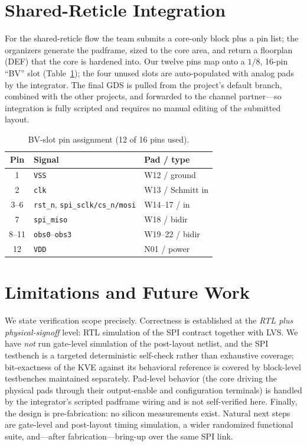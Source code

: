 \documentclass[conference]{IEEEtran}
\begin{document}
\section{Shared-Reticle Integration}
\label{sec:integ}
For the shared-reticle flow the team submits a core-only block plus a pin list;
the organizers generate the padframe, sized to the core area, and return a
floorplan (DEF) that the core is hardened into. Our twelve pins map onto a
$1/8$, 16-pin ``BV'' slot (Table~\ref{tab:pins}); the four unused slots are
auto-populated with analog pads by the integrator. The final GDS is pulled from
the project's default branch, combined with the other projects, and forwarded to
the channel partner---so integration is fully scripted and requires no manual
editing of the submitted layout.

\begin{table}[t]
\caption{BV-slot pin assignment (12 of 16 pins used).}
\label{tab:pins}
\centering
\begin{tabular}{@{}cll@{}}
\toprule
Pin & Signal & Pad / type \\
\midrule
1 & \texttt{VSS} & W12 / ground \\
2 & \texttt{clk} & W13 / Schmitt in \\
3--6 & \texttt{rst\_n}, \texttt{spi\_sclk/cs\_n/mosi} & W14--17 / in \\
7 & \texttt{spi\_miso} & W18 / bidir \\
8--11 & \texttt{obs0}--\texttt{obs3} & W19--22 / bidir \\
12 & \texttt{VDD} & N01 / power \\
\bottomrule
\end{tabular}
\end{table}

\section{Limitations and Future Work}
\label{sec:limits}
We state verification scope precisely. Correctness is established at the
\emph{RTL plus physical-signoff} level: RTL simulation of the SPI contract
together with LVS. We have \emph{not} run gate-level simulation of the
post-layout netlist, and the SPI testbench is a targeted deterministic
self-check rather than exhaustive coverage; bit-exactness of the KVE against its
behavioral reference is covered by block-level testbenches maintained separately.
Pad-level behavior (the core driving the physical pads through their
output-enable and configuration terminals) is handled by the integrator's
scripted padframe wiring and is not self-verified here. Finally, the design is
pre-fabrication: no silicon measurements exist. Natural next steps are
gate-level and post-layout timing simulation, a wider randomized functional
suite, and---after fabrication---bring-up over the same SPI link.
\end{document}
